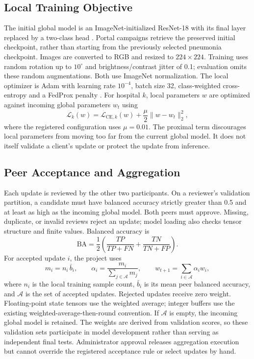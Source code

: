 \documentclass[12pt,a4paper]{report}
\begin{document}
\subsection{Local Training Objective}
The initial global model is an ImageNet-initialized ResNet-18 with its final layer replaced by a two-class head \cite{he2016resnet}. Portal campaigns retrieve the preserved initial checkpoint, rather than starting from the previously selected pneumonia checkpoint. Images are converted to RGB and resized to $224\times224$. Training uses random rotation up to $10^{\circ}$ and brightness/contrast jitter of 0.1; evaluation omits these random augmentations. Both use ImageNet normalization. The local optimizer is Adam with learning rate $10^{-4}$, batch size 32, class-weighted cross-entropy and a FedProx penalty \cite{li2020fedprox}. For hospital $k$, local parameters $w$ are optimized against incoming global parameters $w_t$ using
\begin{equation}
    \mathcal{L}_{k}(w) = \mathcal{L}_{\mathrm{CE},k}(w) + \frac{\mu}{2}\lVert w-w_t\rVert_2^2,
\end{equation}
where the registered configuration uses $\mu=0.01$. The proximal term discourages local parameters from moving too far from the current global model. It does not itself validate a client's update or protect the update from inference.

\subsection{Peer Acceptance and Aggregation}
Each update is reviewed by the other two participants. On a reviewer's validation partition, a candidate must have balanced accuracy strictly greater than 0.5 and at least as high as the incoming global model. Both peers must approve. Missing, duplicate, or invalid reviews reject an update; model loading also checks tensor structure and finite values. Balanced accuracy is
\begin{equation}
    \mathrm{BA}=\frac{1}{2}\left(\frac{TP}{TP+FN}+\frac{TN}{TN+FP}\right).
\end{equation}
For accepted update $i$, the project uses
\begin{equation}
    m_i=n_i\,\bar{b}_i,\qquad
    \alpha_i=\frac{m_i}{\sum_{j\in\mathcal{A}}m_j},\qquad
    w_{t+1}=\sum_{i\in\mathcal{A}}\alpha_i w_i,
\end{equation}
where $n_i$ is the local training sample count, $\bar{b}_i$ is its mean peer balanced accuracy, and $\mathcal{A}$ is the set of accepted updates. Rejected updates receive zero weight. Floating-point state tensors use the weighted average; integer buffers use the existing weighted-average-then-round convention. If $\mathcal{A}$ is empty, the incoming global model is retained. The weights are derived from validation scores, so these validation sets participate in model development rather than serving as independent final tests. Administrator approval releases aggregation execution but cannot override the registered acceptance rule or select updates by hand.
\end{document}
